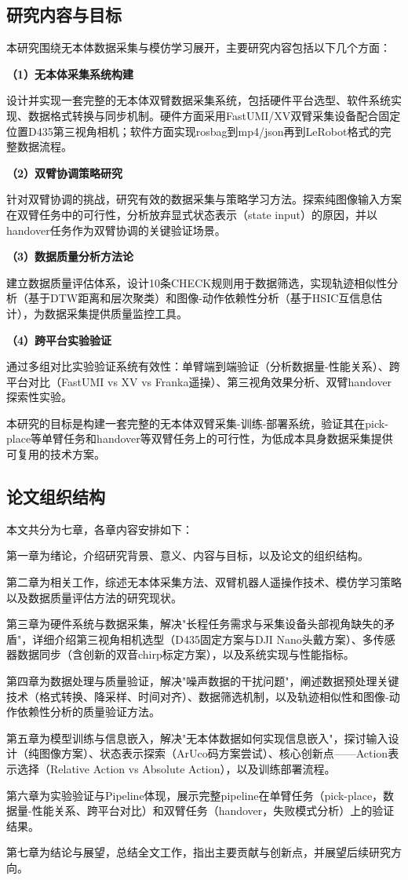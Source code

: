 \subsection{研究内容与目标}

本研究围绕无本体数据采集与模仿学习展开，主要研究内容包括以下几个方面：

\textbf{（1）无本体采集系统构建}

设计并实现一套完整的无本体双臂数据采集系统，包括硬件平台选型、软件系统实现、数据格式转换与同步机制。硬件方面采用FastUMI/XV双臂采集设备配合固定位置D435第三视角相机；软件方面实现rosbag到mp4/json再到LeRobot格式的完整数据流程。

\textbf{（2）双臂协调策略研究}

针对双臂协调的挑战，研究有效的数据采集与策略学习方法。探索纯图像输入方案在双臂任务中的可行性，分析放弃显式状态表示（state input）的原因，并以handover任务作为双臂协调的关键验证场景。

\textbf{（3）数据质量分析方法论}

建立数据质量评估体系，设计10条CHECK规则用于数据筛选，实现轨迹相似性分析（基于DTW距离和层次聚类）和图像-动作依赖性分析（基于HSIC互信息估计），为数据采集提供质量监控工具。

\textbf{（4）跨平台实验验证}

通过多组对比实验验证系统有效性：单臂端到端验证（分析数据量-性能关系）、跨平台对比（FastUMI vs XV vs Franka遥操）、第三视角效果分析、双臂handover探索性实验。

本研究的目标是构建一套完整的无本体双臂采集-训练-部署系统，验证其在pick-place等单臂任务和handover等双臂任务上的可行性，为低成本具身数据采集提供可复用的技术方案。

\subsection{论文组织结构}

本文共分为七章，各章内容安排如下：

第一章为绪论，介绍研究背景、意义、内容与目标，以及论文的组织结构。

第二章为相关工作，综述无本体采集方法、双臂机器人遥操作技术、模仿学习策略以及数据质量评估方法的研究现状。

第三章为硬件系统与数据采集，解决"长程任务需求与采集设备头部视角缺失的矛盾"，详细介绍第三视角相机选型（D435固定方案与DJI Nano头戴方案）、多传感器数据同步（含创新的双音chirp标定方案），以及系统实现与性能指标。

第四章为数据处理与质量验证，解决"噪声数据的干扰问题"，阐述数据预处理关键技术（格式转换、降采样、时间对齐）、数据筛选机制，以及轨迹相似性和图像-动作依赖性分析的质量验证方法。

第五章为模型训练与信息嵌入，解决"无本体数据如何实现信息嵌入"，探讨输入设计（纯图像方案）、状态表示探索（ArUco码方案尝试）、核心创新点——Action表示选择（Relative Action vs Absolute Action），以及训练部署流程。

第六章为实验验证与Pipeline体现，展示完整pipeline在单臂任务（pick-place，数据量-性能关系、跨平台对比）和双臂任务（handover，失败模式分析）上的验证结果。

第七章为结论与展望，总结全文工作，指出主要贡献与创新点，并展望后续研究方向。

